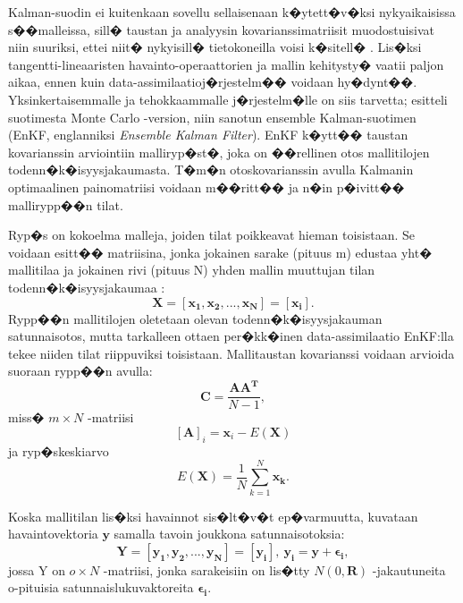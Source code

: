 \documentclass[12pt,a4paper,finnish,margin=2in]{article}
\begin{document}
Kalman-suodin ei kuitenkaan sovellu sellaisenaan k�ytett�v�ksi nykyaikaisissa s��malleissa, sill� taustan ja analyysin kovarianssimatriisit muodostuisivat niin suuriksi, ettei niit� nykyisill� tietokoneilla voisi k�sitell� \citep[esim.][]{mackenzie_2003}. Lis�ksi tangentti-lineaaristen havainto-operaattorien ja mallin kehitysty� vaatii paljon aikaa, ennen kuin data-assimilaatioj�rjestelm�� voidaan hy�dynt��. Yksinkertaisemmalle ja tehokkaammalle j�rjestelm�lle on siis tarvetta; \citet{evensen_1994} esitteli suotimesta Monte Carlo -version, niin sanotun ensemble Kalman-suotimen (EnKF, englanniksi \textit{Ensemble Kalman Filter}). EnKF k�ytt�� taustan kovarianssin arviointiin malliryp�st�, joka on ��rellinen otos mallitilojen todenn�k�isyysjakaumasta. T�m�n otoskovarianssin avulla Kalmanin optimaalinen painomatriisi voidaan m��ritt�� ja n�in p�ivitt�� mallirypp��n tilat.

Ryp�s on kokoelma malleja, joiden tilat poikkeavat hieman toisistaan. Se voidaan esitt�� matriisina, jonka jokainen sarake (pituus m) edustaa yht� mallitilaa ja jokainen rivi (pituus N) yhden mallin muuttujan tilan todenn�k�isyysjakaumaa \citep[esim.][]{evensen_1994}:
\begin{equation} \label{ens_eq}
\mathbf{X} = \mathbf{[x_1,x_2,...,x_N] = [x_i]}.
\end{equation}
Rypp��n mallitilojen oletetaan olevan todenn�k�isyysjakauman satunnaisotos, mutta tarkalleen ottaen per�kk�inen data-assimilaatio EnKF:lla tekee niiden tilat riippuviksi toisistaan. Mallitaustan kovarianssi voidaan arvioida suoraan rypp��n avulla:
\begin{equation} \label{enscov_eq}
\mathbf{C} = \frac{\mathbf{AA^T}}{N-1},
\end{equation}
miss� $m \times N$ -matriisi 
\begin{equation} \label{A_eq}
[\mathbf{A}]_i = \mathbf{x}_i - E(\mathbf{X})
\end{equation}
ja ryp�skeskiarvo
\begin{equation} \label{E_eq}
E(\mathbf{X}) = \frac{1}{N} \sum_{k=1}^{N} \mathbf{x_k}.
\end{equation}

Koska mallitilan lis�ksi havainnot sis�lt�v�t ep�varmuutta, kuvataan havaintovektoria $\mathbf{y}$ samalla tavoin joukkona satunnaisotoksia:
\begin{equation} \label{data_eq}
\mathbf{Y} = \mathbf{[y_1,y_2,...,y_N] = [y_i]},~\mathbf{y_i = y + \epsilon_i},
\end{equation}
jossa Y on $o \times N$ -matriisi, jonka sarakeisiin on lis�tty $N(0,\mathbf{R})$ -jakautuneita o-pituisia satunnaislukuvaktoreita $\mathbf{\epsilon_i}$. 
\end{document}
